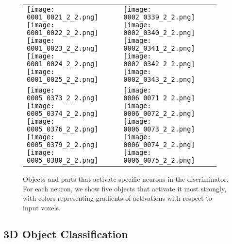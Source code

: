 \documentclass{article}
\newcommand{\presubsection}{\vspace{-8pt}}
\newcommand{\postsubsection}{\vspace{-6pt}}
\begin{document}
\begin{figure}[t!]
\small
\centering
\begin{tabular}{C{0.47\linewidth}C{0.47\linewidth}}
\texttt{[image: 0001\_0021\_2\_2.png]} 
\texttt{[image: 0001\_0022\_2\_2.png]} 
\texttt{[image: 0001\_0023\_2\_2.png]} 
\texttt{[image: 0001\_0024\_2\_2.png]} 
\texttt{[image: 0001\_0025\_2\_2.png]} &
\texttt{[image: 0002\_0339\_2\_2.png]} 
\texttt{[image: 0002\_0340\_2\_2.png]}
\texttt{[image: 0002\_0341\_2\_2.png]} 
\texttt{[image: 0002\_0342\_2\_2.png]} 
\texttt{[image: 0002\_0343\_2\_2.png]} \\
\texttt{[image: 0005\_0373\_2\_2.png]} 
\texttt{[image: 0005\_0374\_2\_2.png]} 
\texttt{[image: 0005\_0376\_2\_2.png]}
\texttt{[image: 0005\_0379\_2\_2.png]}
\texttt{[image: 0005\_0380\_2\_2.png]} &
\texttt{[image: 0006\_0071\_2\_2.png]} 
\texttt{[image: 0006\_0072\_2\_2.png]} 
\texttt{[image: 0006\_0073\_2\_2.png]} 
\texttt{[image: 0006\_0074\_2\_2.png]} 
\texttt{[image: 0006\_0075\_2\_2.png]} 
\end{tabular}
\vspace{-5pt}
\caption{Objects and parts that activate specific neurons in the discriminator. For each neuron, we show five objects that activate it most strongly, with colors representing gradients of activations with respect to input voxels.}
\label{fig:visunit}
\vspace{-15pt}
\end{figure}


\presubsection
\subsection{3D Object Classification}
\postsubsection
\end{document}
